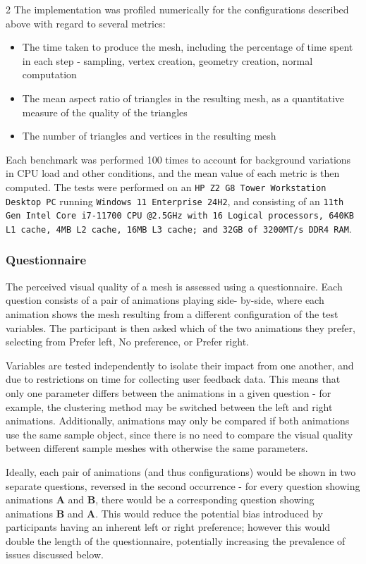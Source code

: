 \documentclass[]{article}
\providecommand{\tightlist}{%
  \setlength{\itemsep}{0pt}\setlength{\parskip}{0pt}}
\begin{document}
\begin{multicols}{2}
The implementation was profiled numerically for the configurations described above with regard to several metrics:
\begin{itemize}
\tightlist
\item The time taken to produce the mesh, including the percentage of time spent in each step - sampling, vertex creation, geometry creation, normal computation
\item The mean aspect ratio of triangles in the resulting mesh, as a quantitative measure of the quality of the triangles
\item The number of triangles and vertices in the resulting mesh
\end{itemize}
Each benchmark was performed 100 times to account for background variations in CPU load and other conditions, and the mean value of each metric is then computed. The tests were performed on an \texttt{HP Z2 G8 Tower Workstation Desktop PC} running \texttt{Windows 11 Enterprise 24H2}, and consisting of an \texttt{11th Gen Intel Core i7-11700 CPU @2.5GHz with 16 Logical processors, 640KB L1 cache, 4MB L2 cache, 16MB L3 cache; and 32GB of 3200MT/s DDR4 RAM}.

\subsubsection{Questionnaire}\label{questionnaire}

The perceived visual quality of a mesh is assessed using a questionnaire. Each question consists of a pair of animations playing side- by-side, where each animation shows the mesh resulting from a different configuration of the test variables. The participant is then asked which of the two animations they prefer, selecting from \textquotesingle Prefer left\textquotesingle, \textquotesingle No preference\textquotesingle, or \textquotesingle Prefer right\textquotesingle.

Variables are tested independently to isolate their impact from one another, and due to restrictions on time for collecting user feedback data. This means that only one parameter differs between the animations in a given question - for example, the clustering method may be switched between the left and right animations. Additionally, animations may only be compared if both animations use the same sample object, since there is no need to compare the visual quality between different sample meshes with otherwise the same parameters.

Ideally, each pair of animations (and thus configurations) would be shown in two separate questions, reversed in the second occurrence - for every question showing animations \textbf{A} and \textbf{B}, there would be a corresponding question showing animations \textbf{B} and \textbf{A}. This would reduce the potential bias introduced by participants having an inherent left or right preference; however this would double the length of the questionnaire, potentially increasing the prevalence of issues discussed below.


\end{multicols}
\end{document}
